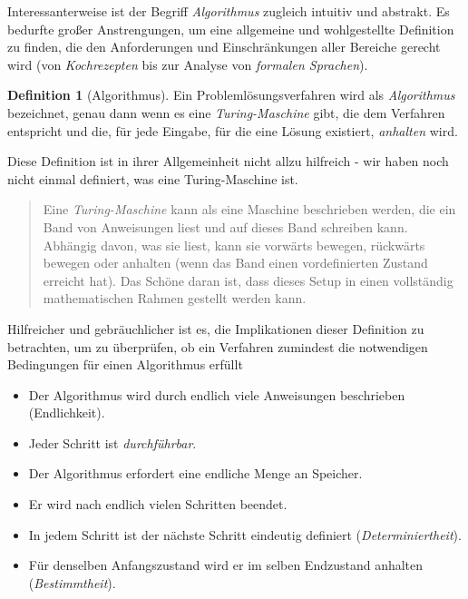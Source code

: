 \documentclass[
]{book}
\providecommand{\tightlist}{%
  \setlength{\itemsep}{0pt}\setlength{\parskip}{0pt}}
\newenvironment {JHSAYS} [0] {\begin{quote}\color{jhsc}} {\end{quote}}
\theoremstyle{definition}
\newtheorem{definition}{Definition}[chapter]
\theoremstyle{definition}
\theoremstyle{definition}
\theoremstyle{definition}
\theoremstyle{remark}
\begin{document}
Interessanterweise ist der Begriff \emph{Algorithmus} zugleich intuitiv und abstrakt. Es bedurfte großer Anstrengungen, um eine allgemeine und wohlgestellte Definition zu finden, die den Anforderungen und Einschränkungen aller Bereiche gerecht wird (von \emph{Kochrezepten} bis zur Analyse von \emph{formalen Sprachen}).

\begin{definition}[Algorithmus]
\protect\hypertarget{def:algorithm}{}\label{def:algorithm}Ein Problemlösungsverfahren wird als \emph{Algorithmus} bezeichnet, genau dann wenn es eine \emph{Turing-Maschine} gibt, die dem Verfahren entspricht und die, für jede Eingabe, für die eine Lösung existiert, \emph{anhalten} wird.
\end{definition}

Diese Definition ist in ihrer Allgemeinheit nicht allzu hilfreich - wir haben noch nicht einmal definiert, was eine Turing-Maschine ist.

\leavevmode\hypertarget{rem-coors}{}%
\begin{JHSAYS}
Eine \emph{Turing-Maschine} kann als eine Maschine beschrieben werden, die ein Band von Anweisungen liest und auf dieses Band schreiben kann. Abhängig davon, was sie liest, kann sie vorwärts bewegen, rückwärts bewegen oder anhalten (wenn das Band einen vordefinierten Zustand erreicht hat). Das Schöne daran ist, dass dieses Setup in einen vollständig mathematischen Rahmen gestellt werden kann.

\end{JHSAYS}

Hilfreicher und gebräuchlicher ist es, die Implikationen dieser Definition zu betrachten, um zu überprüfen, ob ein Verfahren zumindest die notwendigen Bedingungen für einen Algorithmus erfüllt

\begin{itemize}
\tightlist
\item
  Der Algorithmus wird durch endlich viele Anweisungen beschrieben (Endlichkeit).
\item
  Jeder Schritt ist \emph{durchführbar}.
\item
  Der Algorithmus erfordert eine endliche Menge an Speicher.
\item
  Er wird nach endlich vielen Schritten beendet.
\item
  In jedem Schritt ist der nächste Schritt eindeutig definiert (\emph{Determiniertheit}).
\item
  Für denselben Anfangszustand wird er im selben Endzustand anhalten (\emph{Bestimmtheit}).
\end{itemize}
\end{document}
